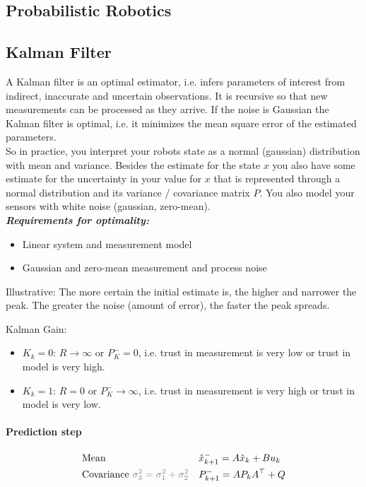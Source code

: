 \begin{multicols*}{2}
\section{Probabilistic Robotics}
\subsection{Kalman Filter}
A Kalman filter is an optimal estimator, i.e. infers parameters of interest
from indirect, inaccurate and uncertain observations.
It is recursive so that new measurements can be processed as they arrive.
If the noise is Gaussian the Kalman filter is optimal, i.e. it minimizes the mean square error of the estimated parameters.\\
So in practice, you interpret your robots state as a normal (gaussian) distribution with mean and variance.
Besides the estimate for the state $x$ you also have some estimate for the uncertainty in your value for $x$ that is represented through a normal distribution and its variance / covariance matrix $P$.
You also model your sensors with white noise (gaussian, zero-mean).\\

\textit{\textbf{Requirements for optimality:}}
\begin{itemize}
	\item Linear system and measurement model
	\item Gaussian and zero-mean measurement and process noise
\end{itemize}

Illustrative:
The more certain the initial estimate is, the higher and narrower the peak.
The greater the noise (amount of error), the faster the peak spreads.\par

Kalman Gain:
\begin{itemize}
	\item $K_k=0$: $R \rightarrow \infty$ or $P_K^- = 0$, i.e. trust in measurement is very low or trust in model is very high.
	\item $K_k=1$: $R = 0$ or $P_K^- \rightarrow \infty$, i.e. trust in measurement is very high or trust in model is very low.
\end{itemize}

\paragraph{Prediction step}
\begin{align*}
	&\text{Mean} && \hat{x}_{k+1}^- = A \hat{x}_{k} + B u_k  \\
	&\text{Covariance } \textcolor{gray}{\sigma_3^2 = \sigma_1^2 + \sigma_2^2} && P_{k+1}^- = A P_k A^\top + Q 
\end{align*}


\end{multicols*}

